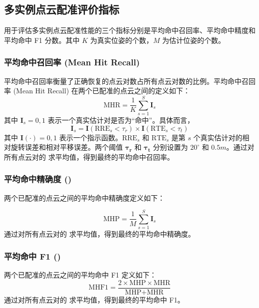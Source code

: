 \subsection{多实例点云配准评价指标}
\label{sec:multiinstance_eval}
用于评估多实例点云配准性能的三个指标分别是平均命中召回率、平均命中精度和平均命中 F1 分数。其中 $K$ 为真实位姿的个数，$M$ 为估计位姿的个数。

\subsubsection{平均命中召回率 (Mean Hit Recall)}
平均命中召回率衡量了正确恢复的点云对数占所有点云对数的比例。平均命中召回率 (Mean Hit Recall) 在两个已配准的点云之间的定义如下：
\begin{equation}
    \text{MHR} = \frac{1}{K} \sum_{s=1}^{S} \boldsymbol{I}_s
\end{equation}
其中 $\boldsymbol{I}_s = {0, 1}$ 表示一个真实估计对是否为“命中”。具体而言，
\begin{equation}
    \boldsymbol{I}_s = \boldsymbol{I}(\text{RRE}_s < \tau_r) \times \boldsymbol{I}(\text{RTE}_s < \tau_t)
\end{equation}
其中 $\boldsymbol{I}(\cdot) = {0, 1}$ 表示一个指示函数。$\text{RRE}_s$ 和 $\text{RTE}_s$ 是第 $s$ 个真实估计对的相对旋转误差和相对平移误差。两个阈值 $\boldsymbol{\tau_r}$ 和 $\boldsymbol{\tau_t}$ 分别设置为 $20^\circ$ 和 $0.5m$。通过对所有点云对的  求平均值，得到最终的平均命中召回率。

\subsubsection{平均命中精确度 ()}
两个已配准的点云之间的平均命中精确度定义如下：

\begin{equation}
\text{MHP} = \frac{1}{M} \sum_{s=1}^{S} \boldsymbol{I}_s
\end{equation}
通过对所有点云对的  求平均值，得到最终的平均命中精确度。

\subsubsection{平均命中 F1 ()}
两个已配准的点云之间的平均命中 F1 定义如下：
\begin{equation}
\text{MHF1} = \frac{2 \times \text{MHP} \times \text{MHR}}{\text{MHP} + \text{MHR}}
\end{equation}
通过对所有点云对的  求平均值，得到最终的平均命中 F1。


